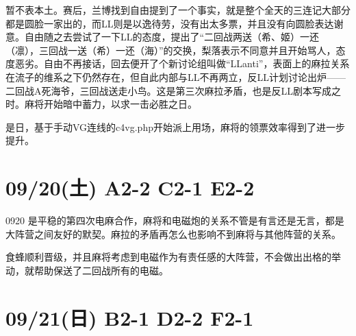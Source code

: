 暂不表本土。赛后，兰博找到自由提到了一个事实，就是整个全天的三连记大部分都是圆脸一家出的，而LL则是以逸待劳，没有出太多票，并且没有向圆脸表达谢意。自由随之去尝试了一下LL的态度，提出了“二回战两送（希、姬）一还（凛），三回战一送（希）一还（海）”的交换，梨落表示不同意并且开始骂人，态度恶劣。自由不再接话，回去便开了个新讨论组叫做“LLanti”，表面上的麻拉关系在流子的维系之下仍然存在，但自此内部与LL不再两立，反LL计划讨论出炉——二回战A死海爷，三回战送走小鸟。这是第三次麻拉矛盾，也是反LL剧本写成之时。麻将开始暗中蓄力，以求一击必胜之日。

是日，基于手动VG连线的c4vg.php开始派上用场，麻将的领票效率得到了进一步提升。

\section{09/20(土) A2-2 C2-1 E2-2}


0920 是平稳的第四次电麻合作，麻将和电磁炮的关系不管是有言还是无言，都是大阵营之间友好的默契。麻拉的矛盾再怎么也影响不到麻将与其他阵营的关系。

食蜂顺利晋级，并且麻将考虑到电磁作为有责任感的大阵营，不会做出出格的举动，就帮助保送了二回战所有的电磁。

\section{09/21(日) B2-1 D2-2 F2-1}



